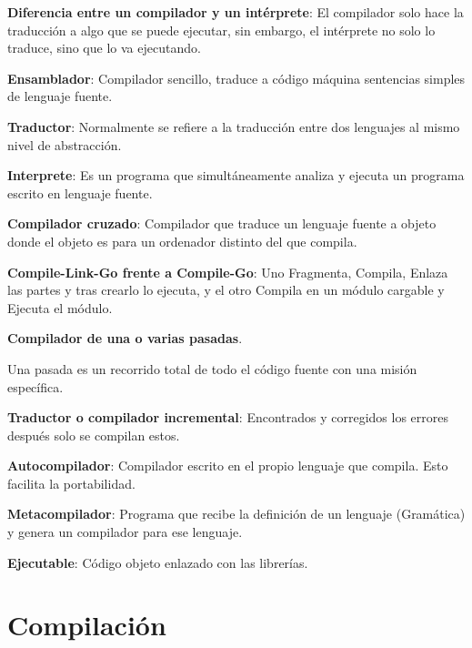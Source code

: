 \documentclass[12pt, twoside, openright]{report} %
\begin{document}
\textbf{Diferencia entre un compilador y un intérprete}: El compilador solo
hace la traducción a algo que se puede ejecutar, sin embargo, el
intérprete no solo lo traduce, sino que lo va ejecutando.

\textbf{Ensamblador}: Compilador sencillo, traduce a código máquina
sentencias simples de lenguaje fuente.

\textbf{Traductor}: Normalmente se refiere a la traducción entre dos
lenguajes al mismo nivel de abstracción.

\textbf{Interprete}: Es un programa que simultáneamente analiza y
ejecuta un programa escrito en lenguaje fuente.

\textbf{Compilador cruzado}: Compilador que traduce un lenguaje fuente a
objeto donde el objeto es para un ordenador distinto del que compila.

\textbf{Compile-Link-Go frente a Compile-Go}: Uno Fragmenta, Compila,
Enlaza las partes y tras crearlo lo ejecuta, y el otro Compila en un
módulo cargable y Ejecuta el módulo.

\textbf{Compilador de una o varias pasadas}.

Una pasada es un recorrido total de todo el código fuente con una misión
específica.

\textbf{Traductor o compilador incremental}: Encontrados y corregidos
los errores después solo se compilan estos.

\textbf{Autocompilador}: Compilador escrito en el propio lenguaje que
compila. Esto facilita la portabilidad.

\textbf{Metacompilador}: Programa que recibe la definición de un
lenguaje (Gramática) y genera un compilador para ese lenguaje.

\textbf{Ejecutable}: Código objeto enlazado con las librerías.


\section{Compilación}
\end{document}
